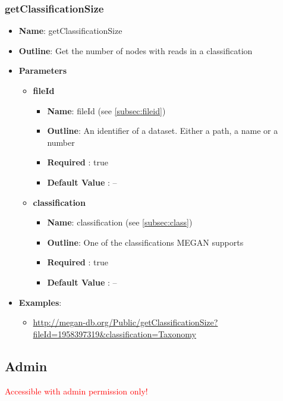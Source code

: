 \documentclass[11pt]{article}
\begin{document}
\subsubsection{getClassificationSize}
\begin{itemize}
	\item \textbf{Name}: getClassificationSize
	\item \textbf{Outline}: Get the number of nodes with reads in a classification
	\item \textbf{Parameters}
		\begin{itemize}
			\item \textbf{fileId}
				\begin{itemize}
					\item \textbf{Name}: fileId (see \ref{subsec:fileid})
					\item \textbf{Outline}: An identifier of a dataset. Either a path, a name or a number
					\item \textbf{Required} : true
					\item \textbf{Default Value} : --
				\end{itemize}
			\item \textbf{classification}
				\begin{itemize}
					\item \textbf{Name}: classification (see \ref{subsec:class})
					\item \textbf{Outline}: One of the classifications MEGAN supports
					\item \textbf{Required} : true
					\item \textbf{Default Value} : --
				\end{itemize}
		\end{itemize}
	\item \textbf{Examples}:
		\begin{itemize}
			\item \url{http://megan-db.org/Public/getClassificationSize?fileId=1958397319&classification=Taxonomy}
		\end{itemize}
\end{itemize}

\subsection{Admin}
\textcolor{red}{Accessible with admin permission only!}
\end{document}
